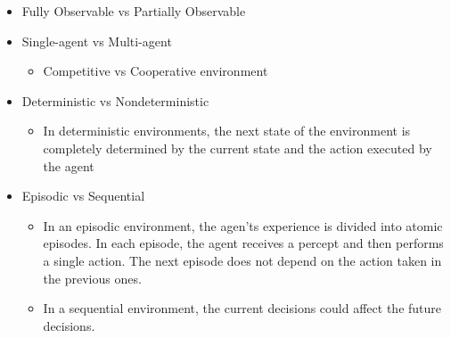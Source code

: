 \documentclass[12pt]{article}
\begin{document}
\begin{itemize}
    \item Fully Observable vs Partially Observable
    
    \item Single-agent vs Multi-agent
    \begin{itemize}
        \item Competitive vs Cooperative environment
    \end{itemize}
    
    \item Deterministic vs Nondeterministic
    
    \begin{itemize}
        \item In deterministic environments, the next state of the environment is completely determined by the current state and the action executed by the agent
    \end{itemize}
    
    \item Episodic vs Sequential
    \begin{itemize}
        \item In an episodic environment, the agen'ts experience is divided into atomic episodes. 
        In each episode, the agent receives a percept and then performs a single action. 
        The next episode does not depend on the action taken in the previous ones.
        
        \item In a sequential environment, the current decisions could affect the future decisions.
    \end{itemize}

\end{itemize}
\end{document}
